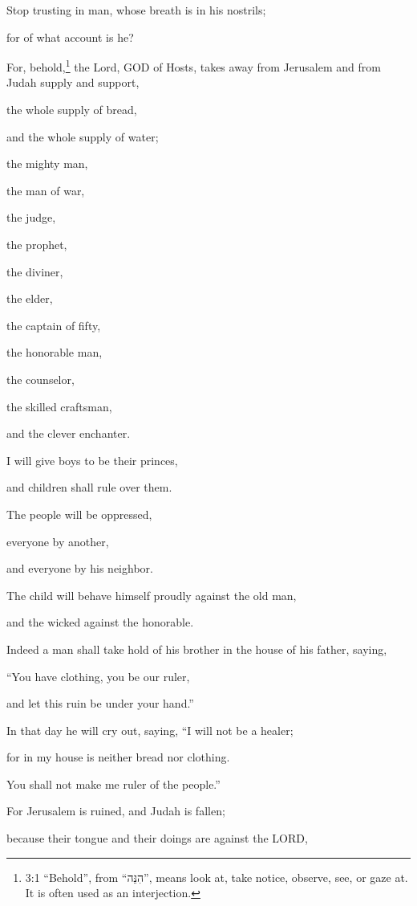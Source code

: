 \myverse{}Stop trusting in man, whose breath is in his nostrils;

for of what account is he?


\mychapter{} \myverse*{}For, behold,\footnote{3:1 “Behold”, from “הִנֵּה”, means look at, take notice, observe, see, or gaze at. It is
	often used as an interjection.} the Lord, GOD of Hosts, takes away from Jerusalem and from Judah
supply and support,

the whole supply of bread,

and the whole supply of water;

\myverse{}the mighty man,

the man of war,

the judge,

the prophet,

the diviner,

the elder,

\myverse{}the captain of fifty,

the honorable man,

the counselor,

the skilled craftsman,

and the clever enchanter.

\myverse{}I will give boys to be their princes,

and children shall rule over them.

\myverse{}The people will be oppressed,

everyone by another,

and everyone by his neighbor.

The child will behave himself proudly against the old man,

and the wicked against the honorable.

\myverse{}Indeed a man shall take hold of his brother in the house of his
father, saying,

“You have clothing, you be our ruler,

and let this ruin be under your hand.”

\myverse{}In that day he will cry out, saying, “I will not be a healer;

for in my house is neither bread nor clothing.

You shall not make me ruler of the people.”

\myverse{}For Jerusalem is ruined, and Judah is fallen;

because their tongue and their doings are against the LORD,

